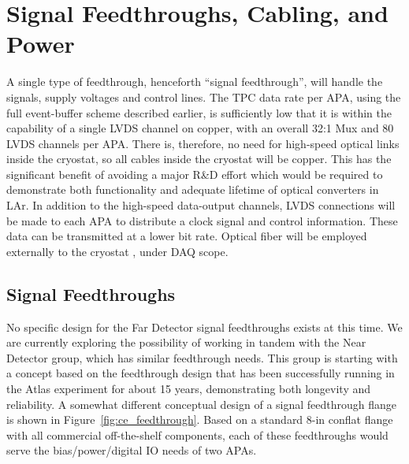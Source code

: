 %
\section{Signal Feedthroughs, Cabling, and Power}
\label{sec:ce_feedthrough}

A single type of feedthrough, henceforth ``signal feedthrough'', will handle the signals, supply voltages and control lines.
The TPC data rate per APA, using the full event-buffer scheme described earlier,
is sufficiently low that it is within the capability of a single LVDS channel on copper,
with an overall 32:1 Mux and 80 LVDS channels per APA.
There is, therefore, no need for high-speed optical links inside the cryostat, so all cables inside the cryostat will be copper.
This has the significant benefit of avoiding a major R\&D effort which would be required to demonstrate
both functionality and adequate lifetime of optical converters in LAr.
In addition to the high-speed data-output channels,
LVDS connections will be made to each APA to distribute a clock signal and control information.
These data can be transmitted at a lower bit rate.
Optical fiber will be employed externally to the cryostat , under DAQ scope. 

%
\subsection{Signal Feedthroughs }
\label{subsec:ce_feedthroughs}

No specific design for the Far Detector signal feedthroughs exists at this time.
We are currently exploring the possibility of working in tandem with the Near Detector group, which has
similar feedthrough needs. This group is starting with a concept based on the feedthrough design that has been successfully
running in the Atlas experiment for about 15 years,  demonstrating both longevity and reliability.
A somewhat different conceptual design of a signal feedthrough flange is shown in Figure~\ref{fig:ce_feedthrough}.
Based on a standard 8-in conflat flange with all commercial off-the-shelf components,
each of these feedthroughs would serve the bias/power/digital IO needs of two APAs.  


